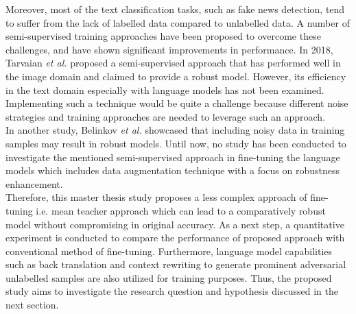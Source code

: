 \documentclass[%
	BCOR=8mm, %
	DIV=12,
	toc=bibliography, %
	toc=listof, %
	oneside, %
	egregdoesnotlikesansseriftitles, %
	]{scrbook}
\begin{document}
Moreover, most of the text classification tasks, such as fake news detection, tend to suffer from the lack of labelled data compared to unlabelled data. A number of semi-supervised training approaches have been proposed to overcome these challenges, and  have shown significant improvements in performance. In 2018, Tarvaian \textit{et al.} \cite{tarvainen_mean_2018} proposed a semi-supervised approach that has performed well in the image domain and  claimed to provide a robust model. However, its efficiency in the text domain especially with language models has not been examined. Implementing such a technique would be quite a challenge because different noise strategies and training approaches are needed to leverage such an approach.\\
In another study, Belinkov \textit{et al.} \cite{belinkov_synthetic_2018} showcased that including noisy data in training samples may result in robust models.  Until now, no study has been conducted to investigate the mentioned semi-supervised approach in fine-tuning the language models which includes data augmentation technique with a focus on robustness enhancement. \\
Therefore, this master thesis study proposes a less complex approach of fine-tuning i.e. mean teacher approach which can lead to a comparatively robust model without compromising in original accuracy. As a next step, a quantitative experiment is conducted to compare the performance of proposed approach with conventional method of fine-tuning. Furthermore, language model capabilities such as back translation and context rewriting to generate prominent adversarial unlabelled samples are also utilized for training purposes. Thus, the proposed study aims to investigate the research question and hypothesis discussed in the next section.
\end{document}
